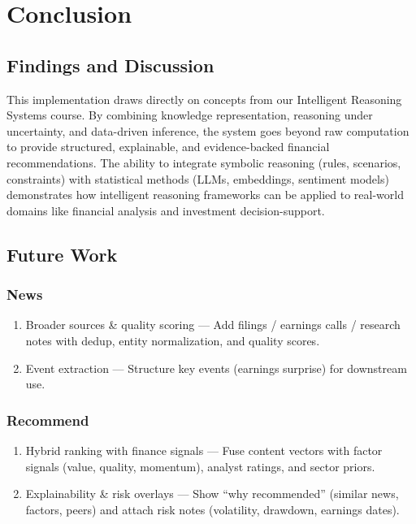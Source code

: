 \chapter{Conclusion}

\section{Findings and Discussion}
This implementation draws directly on concepts from our Intelligent Reasoning Systems course. By combining knowledge representation, reasoning under uncertainty, and data-driven inference, the system goes beyond raw computation to provide structured, explainable, and evidence-backed financial recommendations. The ability to integrate symbolic reasoning (rules, scenarios, constraints) with statistical methods (LLMs, embeddings, sentiment models) demonstrates how intelligent reasoning frameworks can be applied to real-world domains like financial analysis and investment decision-support.


\section{Future Work}
\subsection{News}

\begin{enumerate}
    \item Broader sources & quality scoring — Add filings / earnings calls / research notes with dedup, entity normalization, and quality scores.
    \item Event extraction — Structure key events (earnings surprise) for downstream use.
\end{enumerate}

\subsection{Recommend}

\begin{enumerate}
    \item Hybrid ranking with finance signals — Fuse content vectors with factor signals (value, quality, momentum), analyst ratings, and sector priors.
    \item Explainability & risk overlays — Show “why recommended” (similar news, factors, peers) and attach risk notes (volatility, drawdown, earnings dates).
\end{enumerate}

